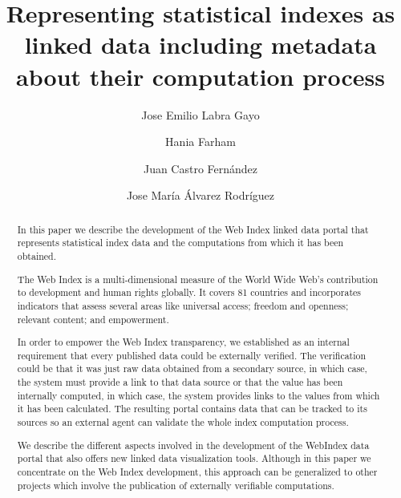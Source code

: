 \documentclass{llncs}
\begin{document}
\title{Representing statistical indexes as linked data including metadata about their computation process}

\author{Jose Emilio Labra Gayo 
 \and Hania Farham
 \and Juan Castro Fernández
 \and Jose María Álvarez Rodríguez}
 

\maketitle
\begin{abstract}

In this paper we describe the development of the Web Index linked data portal that represents statistical index data and the computations from which it has been obtained.  

The Web Index is a multi-dimensional measure of the World Wide Web’s contribution to development and human rights globally. It covers 81 countries and incorporates indicators that assess several areas like universal access; freedom and openness; relevant content; and empowerment.

In order to empower the Web Index transparency, we established as an internal requirement that every published data could be externally verified. 
The verification could be that it was just raw data obtained from a secondary source, in which case, the system must provide a link to that data source or 
that the value has been internally computed, 
in which case, the system provides links to the values from which it has been calculated.
The resulting portal contains data that can be tracked to its sources so an external agent
can validate the whole index computation process.

We describe the different aspects involved in the development of the WebIndex data portal that also offers new linked data visualization tools. Although in this paper we concentrate on the Web Index development, 
this approach can be generalized to other projects which involve 
 the publication of externally verifiable computations.
\end{abstract}
\end{document}
